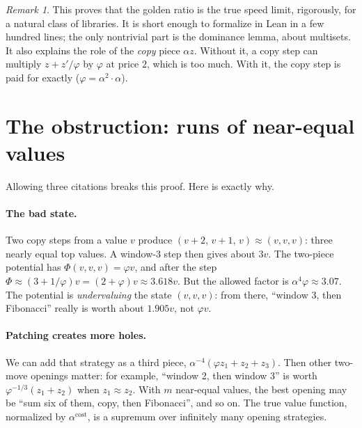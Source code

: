 \documentclass[11pt]{article}
\theoremstyle{remark}
\newtheorem*{remark}{Remark}
\begin{document}
\begin{remark}
This proves that the golden ratio is the true speed limit, rigorously, for a
natural class of libraries. It is short enough to formalize in Lean in a few hundred
lines; the only nontrivial part is the dominance lemma, about multisets. It also explains
the role of the \emph{copy} piece $\alpha z$. Without it, a copy step can multiply
$z+z'/\varphi$ by $\varphi$ at price $2$, which is too much. With it, the copy step is
paid for exactly ($\varphi=\alpha^2\cdot\alpha$).
\end{remark}

\section{The obstruction: runs of near-equal values}\label{sec:obstruction}

Allowing three citations breaks this proof. Here is exactly why.

\paragraph{The bad state.} Two copy steps from a value $v$ produce
$(v+2,\,v+1,\,v)\approx(v,v,v)$: three nearly equal top values. A window-3 step then
gives about $3v$. The two-piece potential has $\Phi(v,v,v)=\varphi v$, and after the step
$\Phi\approx(3+1/\varphi)v=(2+\varphi)v\approx3.618v$. But the allowed factor is
$\alpha^{4}\varphi\approx3.07$. The potential is \emph{undervaluing} the state $(v,v,v)$:
from there, ``window 3, then Fibonacci'' really is worth about $1.905v$, not $\varphi v$.

\paragraph{Patching creates more holes.} We can add that strategy as a third piece,
$\alpha^{-4}(\varphi z_1+z_2+z_3)$. Then other two-move openings matter: for example,
``window 2, then window 3'' is worth $\varphi^{-1/3}(z_1+z_2)$ when $z_1\approx z_2$.
With $m$ near-equal values, the best opening may be ``sum six of them, copy, then
Fibonacci'', and so on. The true value function, normalized by $\alpha^{\text{cost}}$, is
a supremum over infinitely many opening strategies.
\end{document}
